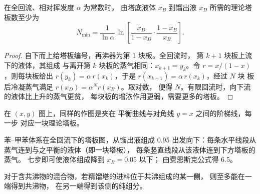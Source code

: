 \begin{proposition}[费恩斯克]\label{prop:b2:liquid-vapour-diagrams:fenske}
在全回流、相对挥发度 $\alpha$ 为常数时，
由塔底液体 $x_B$ 到馏出液
$x_D$ 所需的理论塔板数至少为
\[
  N_{\min} = \frac{1}{\ln\alpha}\,\ln\!\left[\frac{x_D}{1 - x_D}\cdot\frac{1 - x_B}{x_B}\right] .
\]
\end{proposition}

\begin{proof}
自下而上给塔板编号，再沸器为第 1 块板。全回流时，
第 $k + 1$ 块板上流下的液体，其组成
与离开第 $k$ 块板的蒸气相同：$x_{k+1} = y_k$。令 $r = x/(1 - x)$，则每块板给出
$r(y_k) = \alpha\,r(x_k)$，于是 $r(x_{k+1}) = \alpha\,r(x_k)$，经过 $N$ 块
板后冷凝蒸气满足 $r(x_D) = \alpha^N r(x_B)$。取对数，
便得 $N$。有限回流时，向下流的液体比上升的蒸气更贫，
每块板的增浓作用更弱，需要更多的塔板。
\end{proof}

在 $(x, y)$ 图上，同样的作图是夹在
平衡曲线与对角线 $y = x$ 之间的阶梯线，每一步
对应一块理论塔板。

\begin{omfigure}

{\small 苯–甲苯体系在全回流下的塔板图，从馏出液组成
0.95 出发向下：每条水平线段从蒸气连到与之平衡的液体（即一块塔板），
每条竖直线段从该液体连到下方塔板的蒸气。
七步即可使液体组成降到 $x_B = 0.05$ 以下；
由费恩斯克公式得 6.5。}
\end{omfigure}

\begin{proposition}[精馏塔不能越过共沸物]\label{prop:b2:liquid-vapour-diagrams:azeotrope-limit}
对于含共沸物的混合物，若精馏塔的进料位于共沸组成的某一侧，
则至多能在一端得到共沸物，
在另一端得到该侧的纯组分。
\end{proposition}

